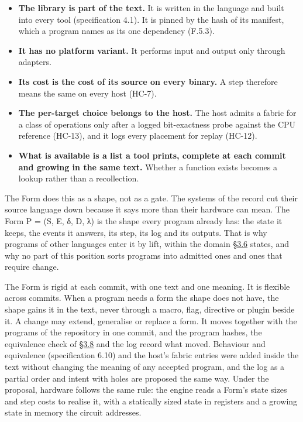 \documentclass[10pt,letterpaper]{article}
\providecommand{\tightlist}{\setlength{\itemsep}{1pt}\setlength{\parskip}{0pt}}
\begin{document}
\begin{itemize}
\tightlist
\item
  \textbf{The library is part of the text.} It is written in the
  language and built into every tool (specification 4.1). It is pinned
  by the hash of its manifest, which a program names as its one
  dependency (F.5.3).
\item
  \textbf{It has no platform variant.} It performs input and output only
  through adapters.
\item
  \textbf{Its cost is the cost of its source on every binary.} A step
  therefore means the same on every host (HC-7).
\item
  \textbf{The per-target choice belongs to the host.} The host admits a
  fabric for a class of operations only after a logged bit-exactness
  probe against the CPU reference (HC-13), and it logs every placement
  for replay (HC-12).
\item
  \textbf{What is available is a list a tool prints, complete at each
  commit and growing in the same text.} Whether a function exists
  becomes a lookup rather than a recollection.
\end{itemize}

The Form does this as a shape, not as a gate. The systems of the record
cut their source language down because it says more than their hardware
can mean. The Form P = (S, E, δ, D, λ) is the shape every program
already has: the state it keeps, the events it answers, its step, its
log and its outputs. That is why programs of other languages enter it by
lift, within the domain
\href{https://research.openie.dev/papers/rce/\#36-one-ecosystem-lossless-and-the-universality-thesis}{§3.6}
states, and why no part of this position sorts programs into admitted
ones and ones that require change.

The Form is rigid at each commit, with one text and one meaning. It is
flexible across commits. When a program needs a form the shape does not
have, the shape gains it in the text, never through a macro, flag,
directive or plugin beside it. A change may extend, generalise or
replace a form. It moves together with the programs of the repository in
one commit, and the program hashes, the equivalence check of
\href{https://research.openie.dev/papers/rce/\#38-behaviour-equivalence-and-dimension}{§3.8}
and the log record what moved. Behaviour and equivalence (specification
6.10) and the host's fabric entries were added inside the text without
changing the meaning of any accepted program, and the log as a partial
order and intent with holes are proposed the same way. Under the
proposal, hardware follows the same rule: the engine reads a Form's
state sizes and step costs to realise it, with a statically sized state
in registers and a growing state in memory the circuit addresses.
\end{document}
